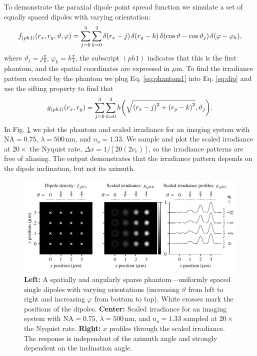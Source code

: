 \documentclass[]{osa-article}
\let\originalleft\left
\let\originalright\right
\renewcommand{\left}{\mathopen{}\mathclose\bgroup\originalleft}
\renewcommand{\right}{\aftergroup\egroup\originalright}
\begin{document}
 To demonstrate the paraxial dipole point spread function we simulate a set of
 equally spaced dipoles with varying orientation:
 \begin{align}
   f_{(ph1)}(r_x, r_y, \vartheta, \varphi) = \sum_{j=0}^3 \sum_{k=0}^3 \delta\left(r_x - j\right)\, \delta\left(r_y - k\right)\, \delta\left(\cos\vartheta - \cos\vartheta_j\right)\, \delta\left(\varphi - \varphi_k\right),\label{eq:phantom1}
 \end{align}
 where $\vartheta_j = j\frac{\pi}{6}$, $\varphi_k = k\frac{\pi}{4}$, the
 subscript $(ph1)$ indicates that this is the first phantom, and the spatial
 coordinates are expressed in $\mu$m. To find the irradiance pattern created by
 the phantom we plug Eq. \eqref{eq:phantom1} into Eq. \eqref{eq:dip} and use
 the sifting property to find that
 \begin{align}
   g_{(ph1)}(r_x, r_y) = \sum_{j=0}^3 \sum_{k=0}^3 h\left(\sqrt{\left(r_x - j\right)^2 + \left(r_y - k\right)^2}, \vartheta_j\right).\label{eq:phantom1irr}
 \end{align}
 In Fig. \ref{fig:ph1} we plot the phantom and scaled irradiance for an imaging
 system with $\text{NA} = 0.75$, $\lambda = 500\,\text{nm}$, and $n_o = 1.33$.
 We sample and plot the scaled irradiance at $20\times$ the Nyquist rate,
 $\Delta x = 1/[20(2\nu_c)]$, so the irradiance patterns are free of aliasing.
 The output demonstrates that the irradiance pattern depends on the dipole
 inclination, but not its azimuth.

 \begin{figure}[ht]
 \centering
   \centering
   \includegraphics[scale=0.8]{../figures/paratfs/ph1.pdf}
   \caption{\textbf{Left:} A spatially and angularly sparse phantom---uniformly
     spaced single dipoles with varying orientations (increasing $\vartheta$
     from left to right and increasing $\varphi$ from bottom to top). White
     crosses mark the positions of the dipoles. \textbf{Center:} Scaled
     irradiance for an imaging system with $\text{NA} = 0.75$,
     $\lambda = 500\,\text{nm}$, and $n_o = 1.33$ sampled at $20\times$ the
     Nyquist rate. \textbf{Right:} $x$ profiles through the scaled irradiance.
     The response is independent of the azimuth angle and strongly dependent on
     the inclination angle.}
   \label{fig:ph1}
 \end{figure}
\end{document}
